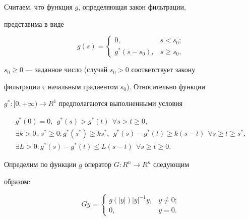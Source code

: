 Считаем, что функция $g$, определяющая закон фильтрации,


представима в виде


\begin{equation}


g(s)=\begin{cases}


{0,} & {s < s_0; } \\


{g^*(s-s_0),} & {s \geq s_0},


\end{cases}


\label{Def_g}


\end{equation}


$s_0 \geq 0$ --- заданное число (случай $s_0 > 0$ соответствует закону


фильтрации с начальным градиентом $s_0$). Относительно функции


$g^*: [0, +\infty) \to R^1$ предполагаются выполненными условия


\begin{gather} \label{Prop1_g*}


g^*(0) = 0, \ \  g^*(s) > g^*(t)\ \ \forall s > t \geq 0,\\


%


\label{Prop2_g*}


\exists k > 0,\ s^* \geq 0 : g^*(s^*) \geq k s^*, 


\ \ g^*(s)-g^*(t) \geq k (s-t)\ \ \forall s \geq t \geq s^*, \\


%


\label{Prop3_g*}


\exists L > 0 : g^*(s)-g^*(t) \leq L (s-t)\ \ \forall s \geq t \geq 0.


\end{gather}





Определим по функции $g$ оператор $G : R^{ n} \to R^{ n}$ следующим


образом:


\begin{equation}


Gy=\begin{cases}


{g(|y|)|y|^{-1} y,}& {y \neq 0;} \\


{0,} & {y = 0 }.


\end{cases}


\label{Def_G}


\end{equation}





